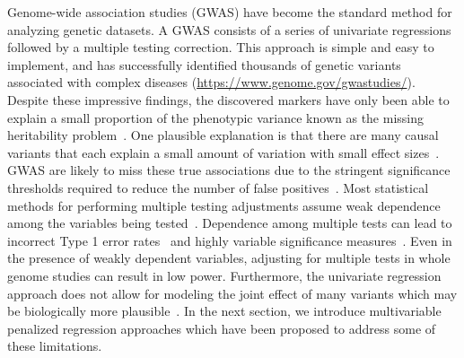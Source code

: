 Genome-wide association studies (GWAS) have become the standard method for analyzing genetic datasets. A GWAS consists of a series of univariate regressions followed by a multiple testing correction. 
This approach is simple and easy to implement, and has successfully identified thousands of genetic variants associated with complex diseases (\url{https://www.genome.gov/gwastudies/}). 
Despite these impressive findings, the discovered markers have only been able to explain a small proportion of the phenotypic variance known as the missing heritability problem~\citep{manolio2009finding}.
One plausible explanation is that there are many causal variants that each explain a small amount of variation with small effect sizes~\citep{yang2010common}.
GWAS are likely to miss these true associations due to the stringent significance thresholds required to reduce the number of false positives~\citep{manolio2009finding}.
Most statistical methods for performing multiple testing adjustments assume weak dependence among the variables being tested~\citep{leek2008general}. 
Dependence among multiple tests can lead to incorrect Type 1 error rates~\citep{lin2013test} and highly variable significance measures~\citep{leek2008general}. 
Even in the presence of weakly dependent variables, adjusting for multiple tests in whole genome studies can result in low power. 
Furthermore, the univariate regression approach does not allow for modeling the joint effect of many variants which may be biologically more plausible~\citep{schadt2009molecular}. 
In the next section, we introduce multivariable penalized regression approaches which have been proposed to address some of these limitations. 



